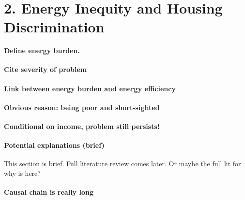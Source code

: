 \documentclass[
]{article}
\begin{document}
\hypertarget{energy-inequity-and-housing-discrimination}{%
\section{2. Energy Inequity and Housing
Discrimination}\label{energy-inequity-and-housing-discrimination}}

\hypertarget{define-energy-burden.}{%
\paragraph{Define energy burden.}\label{define-energy-burden.}}

\hypertarget{cite-severity-of-problem}{%
\paragraph{Cite severity of problem}\label{cite-severity-of-problem}}

\hypertarget{link-between-energy-burden-and-energy-efficiency}{%
\paragraph{Link between energy burden and energy
efficiency}\label{link-between-energy-burden-and-energy-efficiency}}

\hypertarget{obvious-reason-being-poor-and-short-sighted}{%
\paragraph{Obvious reason: being poor and
short-sighted}\label{obvious-reason-being-poor-and-short-sighted}}

\hypertarget{conditional-on-income-problem-still-persists}{%
\paragraph{Conditional on income, problem still
persists!}\label{conditional-on-income-problem-still-persists}}

\hypertarget{potential-explanations-brief}{%
\paragraph{Potential explanations
(brief)}\label{potential-explanations-brief}}

This section is brief. Full literature review comes later. Or maybe the
full lit for why is here?

\hypertarget{causal-chain-is-really-long}{%
\paragraph{Causal chain is really
long}\label{causal-chain-is-really-long}}
\end{document}
